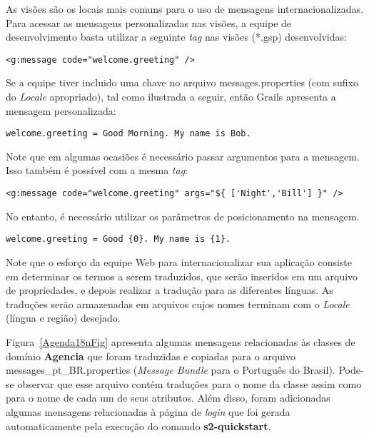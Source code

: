 \begin{small}
\begin{cBox}
As   visões   são   os   locais   mais   comuns  para   o   uso   de   mensagens
internacionalizadas.  Para acessar  as  mensagens personalizadas  nas visões,  a
equipe de desenvolvimento basta utilizar a seguinte {\it tag} nas visões (*.gsp)
desenvolvidas: 

\vspace{0.2cm}

\verb#<g:message code="welcome.greeting" />#

\vspace{0.2cm}

\noindent Se  a equipe tiver  incluido uma chave no  arquivo messages.properties
(com  sufixo do {\it  Locale} apropriado),  tal como  ilustrada a  seguir, então
Grails apresenta a mensagem personalizada:

\vspace{0.2cm}

\verb#welcome.greeting = Good Morning. My name is Bob.#

\vspace{0.2cm}

\noindent Note  que em  algumas ocasiões é  necessário passar argumentos  para a
mensagem. Isso também é possível com a mesma {\it tag}:

\vspace{0.2cm}

\verb#<g:message code="welcome.greeting" args="${ ['Night','Bill'] }" />#

\vspace{0.2cm}

\noindent No entanto,  é necessário utilizar os parâmetros  de posicionamento na
mensagem.

\vspace{0.2cm}

\verb#welcome.greeting = Good {0}. My name is {1}.#
\end{cBox}
\end{small}

\vspace{0.2cm}
\noindent Note que o esforço  da equipe Web para internacionalizar sua aplicação
consiste em determinar  os termos a serem traduzidos, que  serão inseridos em um
arquivo  de  propriedades, e  depois  realizar  a  tradução para  as  diferentes
línguas.  As traduções serão armazenadas  em arquivos cujos nomes terminam com o
{\it Locale} (língua e região) desejado.

Figura~\ref{Agenda18nFig} apresenta algumas mensagens relacionadas às classes de
domínio  {\bf  Agencia}   que  foram  traduzidas  e  copiadas   para  o  arquivo
messages\_pt\_BR.properties   ({\it  Message   Bundle}  para   o   Português  do
Brasil).  Pode-se observar  que esse  arquivo contém  traduções para  o  nome da
classe assim como  para o nome de  cada um de seus atributos.  Além disso, foram
adicionadas  algumas mensagens  relacionadas à  página  de {\it  login} que  foi
gerada automaticamente pela execução do comando {\bf s2-quickstart}. 

